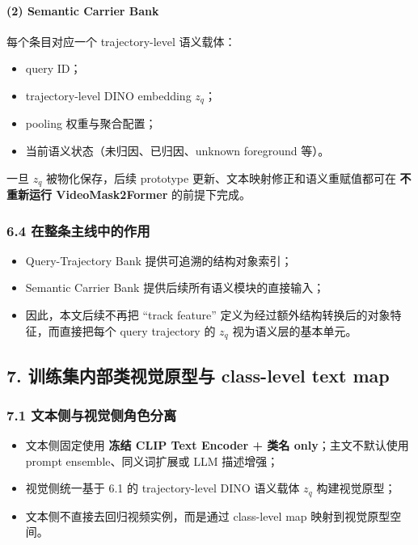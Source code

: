 \documentclass[UTF8]{ctexart}
\begin{document}
\paragraph{(2) Semantic Carrier Bank}
每个条目对应一个 trajectory-level 语义载体：
\begin{itemize}
\item query ID；
\item trajectory-level DINO embedding $z_q$；
\item pooling 权重与聚合配置；
\item 当前语义状态（未归因、已归因、unknown foreground 等）。
\end{itemize}
一旦 $z_q$ 被物化保存，后续 prototype 更新、文本映射修正和语义重赋值都可在 \textbf{不重新运行 VideoMask2Former} 的前提下完成。

\subsubsection*{6.4 在整条主线中的作用}
\begin{itemize}
\item Query-Trajectory Bank 提供可追溯的结构对象索引；
\item Semantic Carrier Bank 提供后续所有语义模块的直接输入；
\item 因此，本文后续不再把 ``track feature'' 定义为经过额外结构转换后的对象特征，而直接把每个 query trajectory 的 $z_q$ 视为语义层的基本单元。
\end{itemize}

\par\noindent\hrulefill\par

\subsection*{7. 训练集内部类视觉原型与 class-level text map}

\subsubsection*{7.1 文本侧与视觉侧角色分离}
\begin{itemize}
\item 文本侧固定使用 \textbf{冻结 CLIP Text Encoder + 类名 only}；主文不默认使用 prompt ensemble、同义词扩展或 LLM 描述增强；
\item 视觉侧统一基于 6.1 的 trajectory-level DINO 语义载体 $z_q$ 构建视觉原型；
\item 文本侧不直接去回归视频实例，而是通过 class-level map 映射到视觉原型空间。
\end{itemize}
\end{document}
